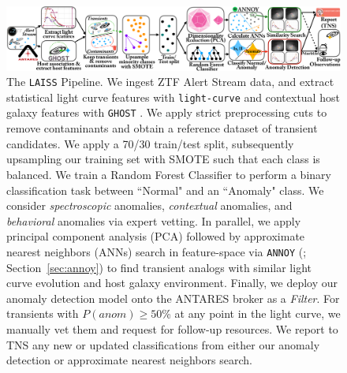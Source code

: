 \documentclass[twocolumn]{aastex63}
\newenvironment{rotatepage}%
    {\global\pdfpageattr\expandafter{\the\pdfpageattr/Rotate 90}}%
    {\clearpage\pagebreak[4]\global\pdfpageattr\expandafter{\the\pdfpageattr/Rotate 0}}%
\newcommand{\laiss}{\texttt{LAISS}}
\begin{document}
\begin{figure}
    \centering
    \includegraphics[width=18cm]{Figures/LAISS_pipeline_schematic.pdf}
    \caption{
    The \laiss{} Pipeline. We ingest ZTF Alert Stream data, and extract statistical light curve features with \texttt{light-curve} \citep{Malanchev-LC} and contextual host galaxy features with \texttt{GHOST} \citep{Gagliano2021}. We apply strict preprocessing cuts to remove contaminants and obtain a reference dataset of transient candidates. We apply a 70/30 train/test split, subsequently upsampling our training set with SMOTE \citep{Chawla2002} such that each class is balanced. We train a Random Forest Classifier to perform a binary classification task between ``Normal" and an ``Anomaly" class. We consider \emph{spectroscopic} anomalies, \emph{contextual} anomalies, and \emph{behavioral} anomalies via expert vetting. In parallel, we apply principal component analysis (PCA) followed by approximate nearest neighbors (ANNs) search in feature-space via \texttt{ANNOY} (\citealt{Github:annoy}; Section~\ref{sec:annoy}) to find transient analogs with similar light curve evolution and host galaxy environment. Finally, we deploy our anomaly detection model onto the ANTARES broker \citep{Matheson2021} as a \emph{Filter}. For transients with $P(anom)\geq50$\% at any point in the light curve, we manually vet them and request for follow-up resources. We report to TNS any new or updated classifications from either our anomaly detection or approximate nearest neighbors search.
    } 
    \label{fig:pipeline}
\end{figure}


\end{document}
